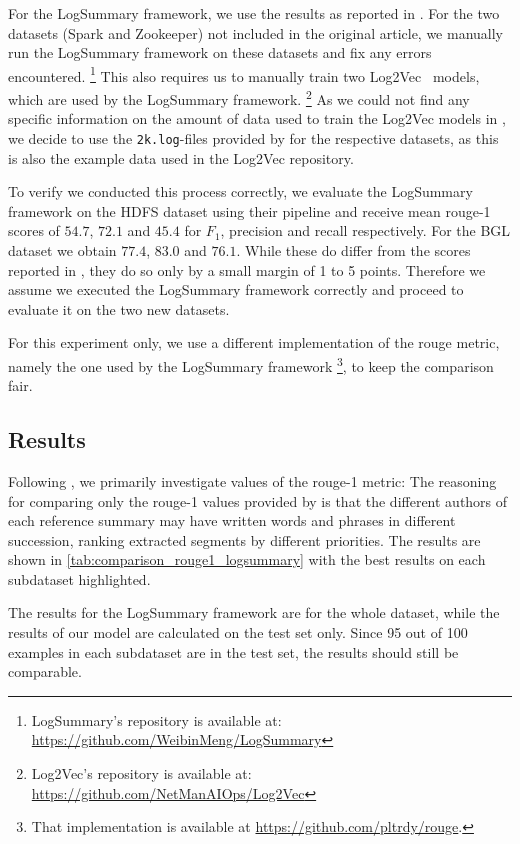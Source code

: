 For the LogSummary framework, we use the results as reported in \parencite{log_summary}.
For the two datasets (Spark and Zookeeper) not included in the original article,
we manually run the LogSummary framework on these datasets and fix any errors encountered.%
\footnote{LogSummary's repository is available at: \url{https://github.com/WeibinMeng/LogSummary}}
This also requires us to manually train two Log2Vec~\parencite{log2vec} models, which are used by the LogSummary framework.%
\footnote{Log2Vec's repository is available at: \url{https://github.com/NetManAIOps/Log2Vec}}
As we could not find any specific information on the amount of data used to train the Log2Vec models in \parencite{log_summary},
we decide to use the \verb+2k.log+-files provided by \parencite{loghub} for the respective datasets,
as this is also the example data used in the Log2Vec repository.

To verify we conducted this process correctly,
we evaluate the LogSummary framework on the HDFS dataset using their pipeline
and receive mean \acs*{rouge}-1 scores of \(54.7\), \(72.1\) and \(45.4\) for \(F_1\), precision and recall respectively.
For the BGL dataset we obtain \(77.4\), \(83.0\) and \(76.1\).
While these do differ from the scores reported in \parencite{log_summary},
they do so only by a small margin of 1 to 5 points.
Therefore we assume we executed the LogSummary framework correctly and proceed to evaluate it on the two new datasets.

For this experiment only, we use a different implementation of the \acs*{rouge} metric, namely the one used by the LogSummary framework%
\footnote{That implementation is available at \url{https://github.com/pltrdy/rouge}.}, to keep the comparison fair.

\subsection{Results}

Following \parencite{log_summary}, we primarily investigate values of the \acs*{rouge}-1 metric:
The reasoning for comparing only the \acs*{rouge}-1 values provided by \citeauthor*{log_summary}
is that the different authors of each reference summary may have written words and phrases in different succession,
ranking extracted segments by different priorities.
The results are shown in \autoref{tab:comparison_rouge1_logsummary} with the best results on each subdataset highlighted.

The results for the LogSummary framework are for the whole dataset,
while the results of our model are calculated on the test set only.
Since 95 out of 100 examples in each subdataset are in the test set,
the results should still be comparable.


